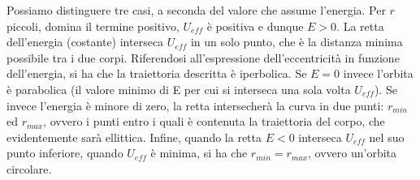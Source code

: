 Possiamo distinguere tre casi, a seconda del valore che assume l'energia. Per $r$ piccoli, domina il termine positivo, $U_{eff}$ è positiva e dunque $E > 0$. La retta dell'energia (costante)  interseca $U_{eff}$ in un solo punto, che è la distanza minima possibile tra i due corpi. Riferendosi all'espressione dell'eccentricità in funzione dell'energia, si ha che la traiettoria descritta è iperbolica. Se $E = 0$ invece l'orbita è parabolica (il valore minimo di E per cui si interseca una sola volta $U_{eff}$). Se invece l'energia è minore di zero, la retta intersecherà la curva in due punti: $r_{min}$ ed $r_{max}$, ovvero i punti entro i quali è contenuta la traiettoria del corpo, che evidentemente sarà ellittica. Infine, quando la retta $E<0$ interseca $U_{eff}$ nel suo punto inferiore, quando $U_{eff}$ è minima, si ha che $r_{min}=r_{max}$, ovvero un'orbita circolare. 
